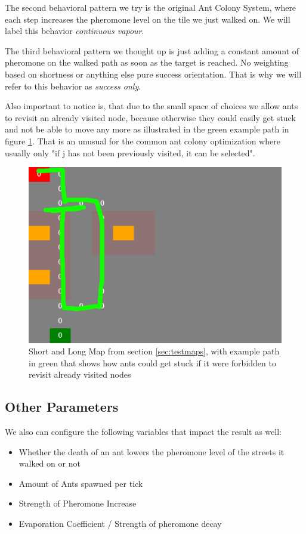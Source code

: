 The second behavioral pattern we try is the original Ant Colony System\cite{maniezzo2002ant}, where each step increases the pheromone level on the tile we just walked on. We will label this behavior \textit{continuous vapour}.

The third behavioral pattern we thought up is just adding a constant amount of pheromone on the walked path as soon as the target is reached. No weighting based on shortness or anything else pure success orientation. That is why we will refer to this behavior as \textit{success only}.

Also important to notice is, that due to the small space of choices we allow ants to revisit an already visited node, because otherwise they could easily get stuck  and not be able to move any more as illustrated in the green example path in figure \ref{fig:gettingstuck}. That is an unusual for the common ant colony optimization where usually only "if j has  not  been  previously  visited,  it  can  be  selected"\cite{dorigo2006ant}.

\begin{figure}[H]
  \centering
  \includegraphics[width=1\linewidth]{images/map_shortlong_deadend}
  \caption{Short and Long Map from section \ref{sec:testmaps}, with example path in green that shows how ants could get stuck if it were forbidden to revisit already visited nodes}
  \label{fig:gettingstuck}
\end{figure}

\subsection{Other Parameters}
\label{sec:otherparamas}
We also can configure the following variables that impact the result as well:
\begin{itemize}
\item  Whether the death of an ant lowers the pheromone level of the streets it walked on or not
\item Amount of Ants spawned per tick
\item Strength of Pheromone Increase
\item Evaporation Coefficient / Strength of pheromone decay
\end{itemize}

